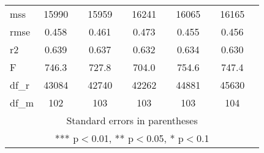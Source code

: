 \documentclass[]{article}
\begin{document}
\begin{tabular}{lcccccccccc}
mss & 15990 &  & 15959 &  & 16241 &  & 16065 &  & 16165 &  \\
rmse & 0.458 &  & 0.461 &  & 0.473 &  & 0.455 &  & 0.456 &  \\
r2 & 0.639 &  & 0.637 &  & 0.632 &  & 0.634 &  & 0.630 &  \\
F & 746.3 &  & 727.8 &  & 704.0 &  & 754.6 &  & 747.4 &  \\
df\_r & 43084 &  & 42740 &  & 42262 &  & 44881 &  & 45630 &  \\
 df\_m & 102 &  & 103 &  & 103 &  & 103 &  & 104 &  \\ \hline
\multicolumn{11}{c}{ Standard errors in parentheses} \\
\multicolumn{11}{c}{ *** p$<$0.01, ** p$<$0.05, * p$<$0.1} \\
\end{tabular}
\end{document}
